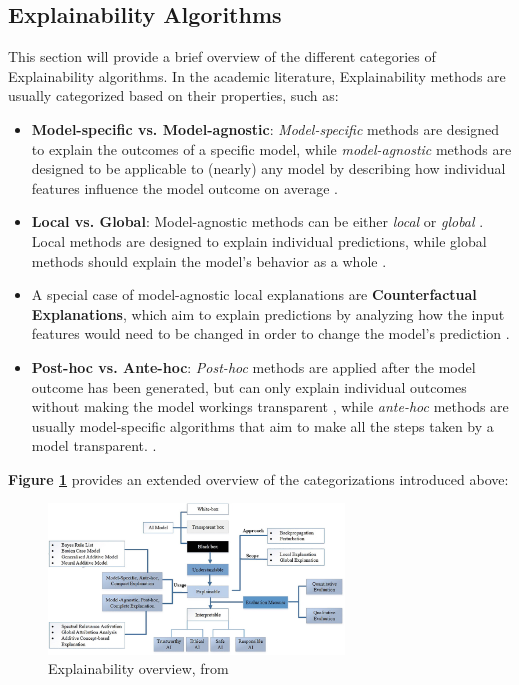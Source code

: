\subsection{Explainability Algorithms}\label{subsec:algorithms}

This section will provide a brief overview of the different categories of Explainability algorithms. %
In the academic literature, Explainability methods are usually categorized based on their properties, such as:
\begin{itemize}
    \item \textbf{Model-specific vs. Model-agnostic}: \textit{Model-specific} methods are designed to explain the outcomes of a specific model, while \textit{model-agnostic} methods are designed to be applicable to (nearly) any model by describing how individual features influence the model outcome on average \parencite{Molnar2023}.
    \item \textbf{Local vs. Global}: Model-agnostic methods can be either \textit{local} or \textit{global} \parencite{Molnar2023}. Local methods are designed to explain individual predictions, while global methods should explain the model's behavior as a whole \parencite{SALEEM2022165}.
    \item A special case of model-agnostic local explanations are \textbf{Counterfactual Explanations}, which aim to explain predictions by analyzing how the input features would need to be changed in order to change the model's prediction \parencite{wachter2017}.
    \item \textbf{Post-hoc vs. Ante-hoc}: \textit{Post-hoc} methods are applied after the model outcome has been generated, but can only explain individual outcomes without making the model workings transparent \parencite{Lipton2018}, while \textit{ante-hoc} methods are usually model-specific algorithms that aim to make all the steps taken by a model transparent. \parencite{SALEEM2022165}.
\end{itemize}

\textbf{Figure \ref{fig:explainability_overview}} provides an extended overview of the categorizations introduced above:

\begin{figure}[h]
    \centering
    \includegraphics[width=0.7\textwidth]{images/CH02_algorithms_overview_Saleem.jpg}
    \caption{Explainability overview, from \cite{SALEEM2022165}}
    \label{fig:explainability_overview}
\end{figure}

